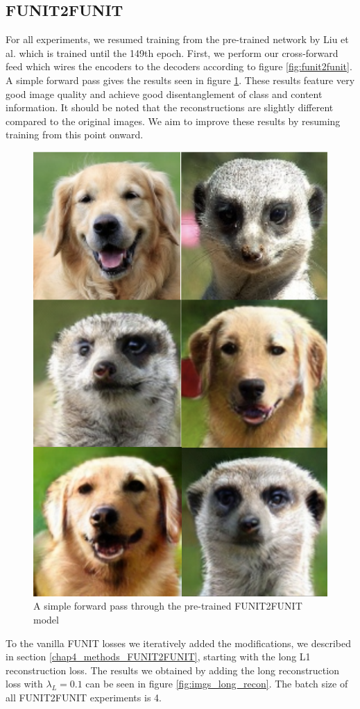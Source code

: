 \documentclass[conference]{IEEEtran}
\begin{document}
\subsection{FUNIT2FUNIT}
For all experiments, we resumed training from the pre-trained network by Liu et al. which is trained until the 149th epoch. First, we perform our cross-forward feed which wires the encoders to the decoders according to figure \ref{fig:funit2funit}. A simple forward pass gives the results seen in figure \ref{fig:cross}. These results feature very good image quality and achieve good disentanglement of class and content information. It should be noted that the reconstructions are slightly different compared to the original images. We aim to improve these results by resuming training from this point onward. 

\begin{figure}[h!]
	\centering
	\includegraphics[width=0.5\linewidth]{figures/funit_cross_forward_pass.png}
	\caption{A simple forward pass through the pre-trained FUNIT2FUNIT model}
	\label{fig:cross}
\end{figure}

To the vanilla FUNIT losses we iteratively added the modifications, we described in section \ref{chap4_methods_FUNIT2FUNIT}, starting with the long L1 reconstruction loss. The results we obtained by adding the long reconstruction loss with $\lambda_{L}=0.1$ can be seen in figure \ref{fig:imgs_long_recon}. The batch size of all FUNIT2FUNIT experiments is 4.
\end{document}
